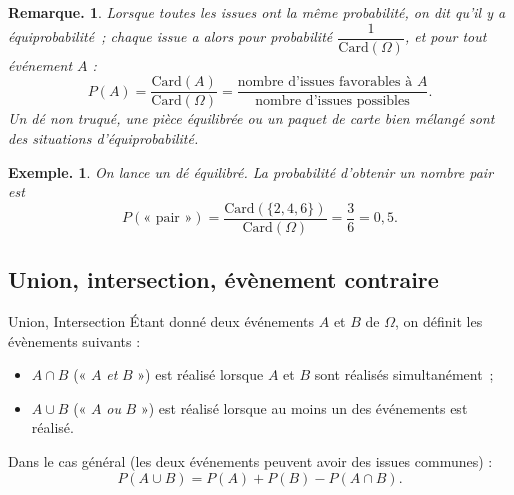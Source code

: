 \documentclass[12pt]{article}
\theoremstyle{break}
\newtheorem*{example}{Exemple.}
\newtheorem*{remark}{Remarque.}
\begin{document}
\begin{remark}
  Lorsque toutes les issues ont la même probabilité, on dit qu'il y a \emph{équiprobabilité}~; chaque issue a alors pour probabilité $\dfrac{1}{\mathrm{Card}(\Omega)}$, et pour tout événement $A$ :
  \[
  P(A) = \frac{\mathrm{Card}(A)}{\mathrm{Card}(\Omega)} = \frac{\text{nombre d'issues favorables à } A}{\text{nombre d'issues possibles}}.
  \]
  Un dé non truqué, une pièce équilibrée ou un paquet de carte bien mélangé sont des situations d'équiprobabilité.
\end{remark}
 
\begin{example}
  On lance un dé équilibré. La probabilité d'obtenir un nombre pair est
  \[
  P(\text{« pair »}) = \frac{\mathrm{Card}(\{2,4,6\})}{\mathrm{Card}(\Omega)} = \frac{3}{6} = 0{,}5.
  \]
\end{example}
 
\subsection{Union, intersection, évènement contraire}
 
\begin{definition}{Union, Intersection}{}
Étant donné deux événements $A$ et $B$ de $\Omega$, on définit les évènements suivants :
\begin{itemize}
  \item $A\cap B$ (« $A$ \emph{et} $B$ ») est réalisé lorsque $A$ et $B$ sont réalisés simultanément~;
  \item $A\cup B$ (« $A$ \emph{ou} $B$ ») est réalisé lorsque au moins un des événements est réalisé.
\end{itemize}
\end{definition}
 
\begin{center}
\end{center}

\begin{proposition}{}{}
  Dans le cas général (les deux événements peuvent avoir des issues communes) :
  \[
  P(A\cup B) = P(A) + P(B) - P(A\cap B).
  \]
\end{proposition}
\end{document}
